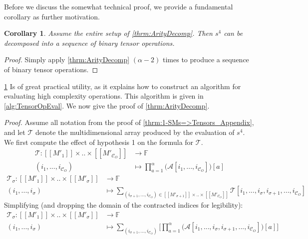 \documentclass{article}
\theoremstyle{plain}
\newtheorem{corollary}[theorem]{Corollary}
\theoremstyle{definition}
\theoremstyle{remark}
\newcommand{\cC}{\mathcal{C}}
\newcommand{\cA}{\mathcal{A}}
\newcommand{\cT}{\mathcal{T}}
\begin{document}
Before we discuss the somewhat technical proof, we provide a fundamental corollary as further motivation.
\begin{corollary}
	Assume the entire setup of \cref{thrm:ArityDecomp}. Then $s^4$ can be decomposed into a sequence of binary tensor operations.
	\label{cor:DecompIntoBinary}
\end{corollary}
\begin{proof}
	Simply apply \cref{thrm:ArityDecomp} $(\alpha - 2)$ times to produce a sequence of binary tensor operations.
\end{proof}
\cref{cor:DecompIntoBinary} Is of great practical utility, as it explains how to construct an algorithm for evaluating high complexity operations. This algorithm is given in \cref{alg:TensorOpEval}. We now give the proof of \cref{thrm:ArityDecomp}.

\noindent\textit{Proof.}
Assume all notation from the proof of \cref{thrm:1-SMs=>Tensors_Appendix}, and let $\cT$ denote the multidimensional array produced by the evaluation of $s^4$. We first compute the effect of hypothesis 1 on the formula for $\cT$.
\begin{equation*}
	\begin{aligned}
		\cT: [[M'_1]]  \times .. \times [[M'_{\cC_O}]] &\rightarrow \mathbb{F}\\
		(i_1, ..., i_{\cC_O}) &\mapsto  \prod_{a=1}^{\alpha} \big(\cA[i_1, ...,  i_{\cC_O}] \big)[a]
	\end{aligned}
\end{equation*}
\begin{equation*}
	\begin{aligned}
		\cT_{\sigma}: [[M'_1]]  \times .. \times [[M'_{\sigma}]] &\rightarrow \mathbb{F}\\
		(i_1, ..., i_{\sigma}) &\mapsto  \sum_{(i_{\sigma + 1},...,i_{\cC_O}) \in [[M'_{\sigma + 1}]]  \times .. 	\times [[M'_{\cC_O}]]} \cT[i_1, ..., i_{\sigma}, i_{\sigma + 1},..., i_{\cC_O}]
	\end{aligned}
\end{equation*}
Simplifying (and dropping the domain of the contracted indices for legibility):
\begin{equation}
	\begin{aligned}
		\cT_{\sigma}: [[M'_1]]  \times .. \times [[M'_{\sigma}]] &\rightarrow \mathbb{F}\\
		(i_1, ..., i_{\sigma}) &\mapsto  \sum_{(i_{\sigma + 1},...,i_{\cC_O})} \Bigg[ \prod_{a=1}^{\alpha} \big(\cA[i_1, ..., i_{\sigma}, i_{\sigma + 1},..., i_{\cC_O}] \big)[a] \Bigg]
	\end{aligned}
	\label{eq:TOrig}
\end{equation}
\end{document}
